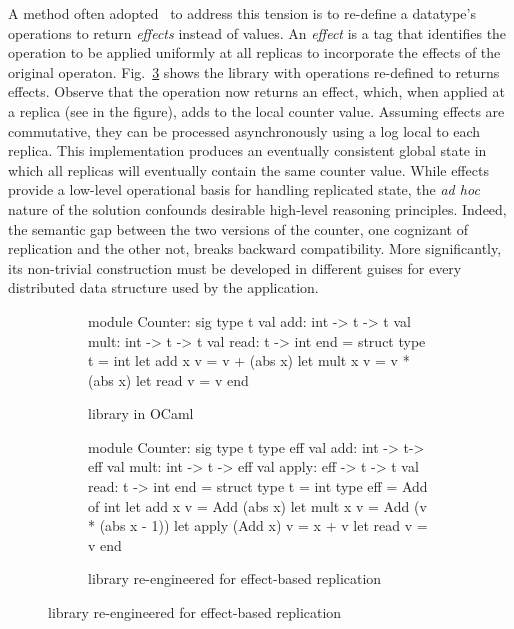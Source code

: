 A method often adopted~\cite{crdts, pldi15, gotsman-popl16} to address
this tension is to re-define a datatype's operations to return
\emph{effects} instead of values.  An \emph{effect} is a tag that
identifies the operation to be applied uniformly at all replicas to
incorporate the effects of the original
operaton. Fig.~\ref{fig:counter-rdt} shows the  library
with operations re-defined to returns effects.  Observe that the
 operation now returns an  effect, which,
when applied at a replica (see  in the figure), adds  to
the local counter value.  Assuming effects are commutative, they can
be processed asynchronously using a log local to each replica.  This
implementation produces an eventually consistent global state in which
all replicas will eventually contain the same counter value.  While
effects provide a low-level operational basis for handling replicated
state, the \emph{ad hoc} nature of the solution confounds desirable
high-level reasoning principles.  Indeed, the semantic gap between the
two versions of the counter, one cognizant of replication and the
other not, breaks backward compatibility.  More significantly, its
non-trivial construction must be developed in different guises for
every distributed data structure used by the application.
\begin{figure}
\begin{subfigure}[b]{0.4\textwidth}
  \begin{ocaml}
    module Counter: sig
      type t
      val add: int -> t -> t
      val mult: int -> t -> t
      val read: t -> int
    end = struct
      type t = int
      let add x v = v + (abs x)
      let mult x v = v * (abs x)
      let read v = v
    end
  \end{ocaml}
\caption{ library in OCaml}
\label{fig:counter-adt}
\end{subfigure}
\begin{subfigure}[b]{0.56\textwidth}
  \begin{ocaml}
    module Counter: sig
      type t
      type eff 
      val add: int -> t-> eff
      val mult: int -> t -> eff
      val apply: eff -> t -> t
      val read: t -> int
    end = struct
      type t = int
      type eff = Add of int
      let add x v = Add (abs x)
      let mult x v = Add (v * (abs x - 1))
      let apply (Add x) v = x + v
      let read v = v
    end
  \end{ocaml}
\caption{ library re-engineered for effect-based replication}
\label{fig:counter-rdt}
\end{subfigure}
\end{figure}
